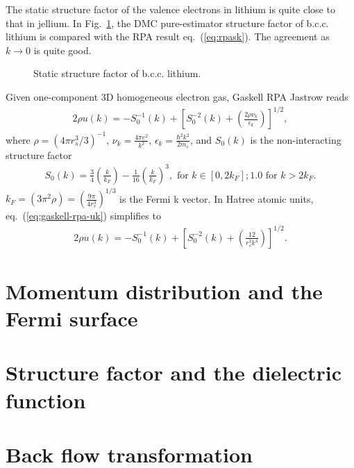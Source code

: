 \documentclass[draftthesis,fullpage]{uiucthesis}
\begin{document}
The static structure factor of the valence electrons in lithium is quite close to that in jellium. In Fig.~\ref{fig:rpask}, the DMC pure-estimator structure factor of b.c.c. lithium is compared with the RPA result eq.~(\ref{eq:rpask}). The agreement as $k\rightarrow0$ is quite good.

\begin{figure}[h]
\caption{Static structure factor of b.c.c. lithium.\label{fig:rpask}}
\end{figure}

Given one-component 3D homogeneous electron gas, Gaskell RPA Jastrow reads~\cite{Holzmann2009}
\begin{align}
2\rho u(k) = -S_0^{-1}(k) + \left[ S_0^{-2}(k) + \left( \frac{2\rho \nu_k}{\epsilon_k} \right) \right] ^{1/2}, \label{eq:gaskell-rpa-uk}
\end{align}
where $\rho = (4\pi r_s^3/3)^{-1}$, $\nu_k = \frac{4\pi e^2}{k^2}$, $\epsilon_k=\frac{\hbar^2 k^2}{2m_e}$, and $S_0(k)$ is the non-interacting structure factor
\begin{align}
S_0(k) = \frac{3}{4} \left(\frac{k}{k_F}\right) - \frac{1}{16}\left(\frac{k}{k_F}\right)^3,\text{ for } k\in[0,2k_F]; 1.0 \text{ for } k > 2k_F.
\end{align}
$k_F=(3\pi^2\rho)=\left(\frac{9\pi}{4r_s^3}\right)^{1/3}$ is the Fermi k vector. In Hatree atomic units, eq.~(\ref{eq:gaskell-rpa-uk}) simplifies to
\begin{align}
2\rho u(k) = -S_0^{-1}(k) + \left[ S_0^{-2}(k) + \left( \frac{12}{r_s^3 k^4} \right) \right]^{1/2}. \label{eq:gaskell-uk-au}
\end{align}





\section{Momentum distribution and the Fermi surface}
\section{Structure factor and the dielectric function}
\section{Back flow transformation}
\end{document}
